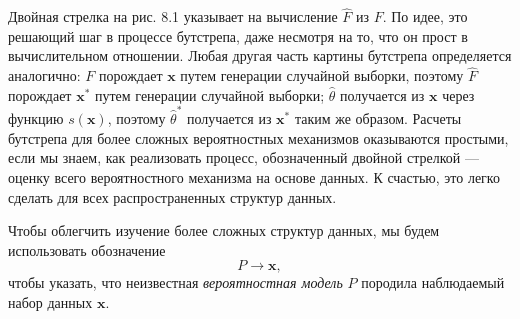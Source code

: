 Двойная стрелка на рис. 8.1 указывает на вычисление $\hat{F}$ из $F$. По идее, это решающий шаг в процессе бутстрепа, даже несмотря на то, что он прост в вычислительном отношении. Любая другая часть картины бутстрепа определяется аналогично: $F$ порождает $\textbf{x}$ путем генерации случайной выборки, поэтому $\hat{F}$ порождает $\textbf{x}^*$ путем генерации случайной выборки; $\hat{\theta}$ получается из $\textbf{x}$ через функцию $s(\textbf{x})$, поэтому $\hat{\theta}^*$ получается из $\textbf{x}^*$ таким же образом. Расчеты бутстрепа для более сложных вероятностных механизмов оказываются простыми, если мы знаем, как реализовать процесс, обозначенный двойной стрелкой --- оценку всего вероятностного механизма на основе данных. К счастью, это легко сделать для всех распространенных структур данных.

Чтобы облегчить изучение более сложных структур данных, мы будем использовать обозначение
\begin{equation}
	P \to \textbf{x},
\end{equation}
чтобы указать, что неизвестная \textit{вероятностная модель} $P$ породила наблюдаемый набор данных $\textbf{x}$.